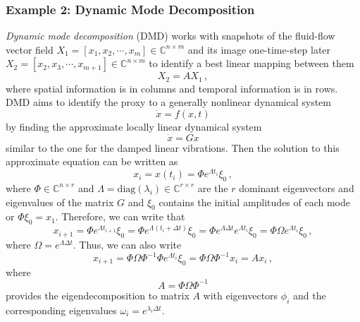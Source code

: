 \documentclass[10pt]{article}
\begin{document}
\subsubsection{Example 2: Dynamic Mode Decomposition}
{\em Dynamic mode decomposition} (DMD) works with snapshots of the fluid-flow vector field $X_1=[x_1,x_2,\cdots, x_{m}]\in\mathbb{C}^{n\times m}$ and its image one-time-step later $X_2=[x_2,x_3,\cdots, x_{m+1}]\in\mathbb{C}^{n\times m}$ to identify a best linear mapping between them
\begin{equation}\label{DMDeq0}
    X_2 = A X_1\,,
\end{equation}
where spatial information is in columns and temporal information is in rows.
DMD aims to identify the proxy to a generally nonlinear dynamical system
\begin{equation}
    \dot x = f(x,t)
\end{equation} 
by finding the approximate locally linear dynamical system
\begin{equation}
    \dot x = Gx
\end{equation}
similar to the one for the damped linear vibrations.
Then the solution to this approximate equation can be written as
\begin{equation}\label{DMDev}
    x_i = x(t_i) = \Phi e^{\Lambda t_i} \xi_0\,,
\end{equation}
where $\Phi\in\mathbb{C}^{n\times r}$ and $\Lambda = \mathrm{diag}({\lambda_{i}})\in \mathbb{C}^{r\times r}$ are the $r$ dominant eigenvectors and eigenvalues of the matrix $G$ and $\xi_0$ contains the initial amplitudes of each mode or $\Phi \xi_0 = x_1$.
Therefore, we can write that
\begin{equation}\label{xp1}
    x_{i+1} = \Phi e^{\Lambda t_{i+1}} \xi_0 = \Phi e^{\Lambda (t_{i}+\Delta t)} \xi_0 = \Phi e^{\Lambda \Delta t}e^{\Lambda t_{i}} \xi_0 = \Phi \Omega e^{\Lambda t_{i}}\xi_0\,,
\end{equation}
where $\Omega = e^{\Lambda \Delta t}$.
Thus, we can also write
\begin{equation}
    x_{i+1} = \Phi \Omega \Phi^{-1} \Phi e^{\Lambda t_{i}}\xi_0 = \Phi \Omega \Phi^{-1} x_{i} = A x_i\,,
\end{equation}
where
\begin{equation}
    A = \Phi \Omega \Phi^{-1}
\end{equation}
provides the eigendecomposition to matrix $A$ with eigenvectors $\phi_i$ and the corresponding eigenvalues $\omega_i = e^{\lambda_i \Delta t}$.
\end{document}
